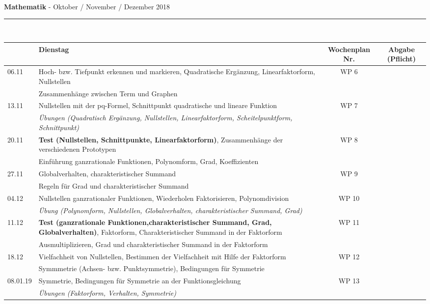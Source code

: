 \documentclass[oneside,openany,headings=optiontotoc,11pt,numbers=noenddot]{scrreprt}
\begin{document}
				
	\begin{landscape}
		\noindent
		\textbf{Mathematik} - Oktober / November / Dezember 2018\\
		\rule{1.7\textwidth}{0.2pt}\\
		\par\noindent
		\begin{tabularx}{1.7\textwidth}{|l|X|c|c|}
			\hline
			& Dienstag & Wochenplan Nr. & Abgabe (Pflicht)\\
			\hline
			06.11 & Hoch- bzw. Tiefpunkt erkennen und markieren, Quadratische Ergänzung, Linearfaktorform, Nullstellen & WP 6 &\\
			& Zusammenhänge zwischen Term und Graphen & & \\
			\hline
			\hline
			13.11 & Nullstellen mit der pq-Formel, Schnittpunkt quadratische und lineare Funktion & WP 7 &\\
			& \textit{Übungen (Quadratisch Ergänzung, Nullstellen, Linearfaktorform, Scheitelpunktform, Schnittpunkt)} & & \\
			\hline
			20.11 & \textbf{Test (Nullstellen, Schnittpunkte, Linearfaktorform)}, Zusammenhänge der verschiedenen Prototypen & WP 8 &\\
			& Einführung ganzrationale Funktionen, Polynomform, Grad, Koeffizienten & & \\
			\hline
			27.11 & Globalverhalten, charakteristischer Summand & WP 9 &\\
			& Regeln für Grad und charakteristischer Summand & & \\
			\hline
			04.12 & Nullstellen ganzrationaler Funktionen, Wiederholen Faktorisieren, Polynomdivision & WP 10 & \\
			& \textit{Übung (Polynomform, Nullstellen, Globalverhalten, charakteristischer Summand, Grad)} & & \\
			\hline
			\hline
			11.12 & \textbf{Test (ganzrationale Funktionen,charakteristischer Summand, Grad, Globalverhalten)}, Faktorform, Charakteristischer Summand in der Faktorform & WP 11 & \\
			& Ausmultiplizieren, Grad und charakteristischer Summand in der Faktorform & & \\
			\hline
			18.12 & Vielfachheit von Nullstellen, Bestimmen der Vielfachheit mit Hilfe der Faktorform & WP 12 & \\
			& Symmmetrie (Achsen- bzw. Punktsymmetrie), Bedingungen für Symmetrie & & \\
			\hline
			08.01.19 & Symmetrie, Bedingungen für Symmetrie an der Funktionsgleichung & WP 13 & \\
			& \textit{Übungen (Faktorform, Verhalten, Symmetrie)} & & \\
			\hline
		\end{tabularx}
	\end{landscape}
\end{document}
